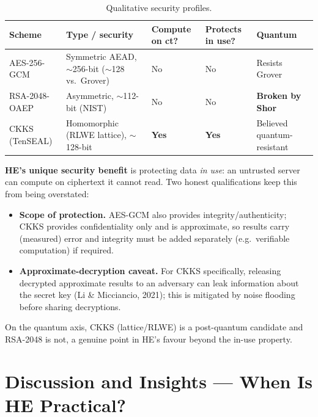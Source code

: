 \documentclass[11pt,a4paper]{article}
\begin{document}
\begin{table}[H]
\centering
\caption{Qualitative security profiles.}
\begin{tabularx}{\linewidth}{@{}p{2.1cm} >{\raggedright\arraybackslash}X >{\centering\arraybackslash}p{1.7cm} >{\centering\arraybackslash}p{1.7cm} >{\raggedright\arraybackslash}p{2.5cm}@{}}
\toprule
\textbf{Scheme} & \textbf{Type / security} & \textbf{Compute on ct?} & \textbf{Protects in use?} & \textbf{Quantum}\\
\midrule
AES-256-GCM   & Symmetric AEAD, $\sim$256-bit ($\sim$128 vs.\ Grover) & No & No & Resists Grover\\
RSA-2048-OAEP & Asymmetric, $\sim$112-bit (NIST) & No & No & \textbf{Broken by Shor}\\
CKKS (TenSEAL)& Homomorphic (RLWE lattice), $\sim$128-bit & \textbf{Yes} & \textbf{Yes} & Believed quantum-resistant\\
\bottomrule
\end{tabularx}
\end{table}

\textbf{HE's unique security benefit} is protecting data \emph{in use}: an
untrusted server can compute on ciphertext it cannot read. Two honest
qualifications keep this from being overstated:

\begin{itemize}[leftmargin=1.4em,itemsep=1pt]
  \item \textbf{Scope of protection.} AES-GCM also provides
    integrity/authenticity; CKKS provides confidentiality only and is
    approximate, so results carry (measured) error and integrity must be added
    separately (e.g.\ verifiable computation) if required.
  \item \textbf{Approximate-decryption caveat.} For CKKS specifically, releasing
    decrypted approximate results to an adversary can leak information about the
    secret key (Li \& Micciancio, 2021); this is mitigated by noise flooding
    before sharing decryptions.
\end{itemize}

On the quantum axis, CKKS (lattice/RLWE) is a post-quantum candidate and
RSA-2048 is not, a genuine point in HE's favour beyond the in-use property.

\section{Discussion and Insights --- When Is HE Practical?}
\end{document}
